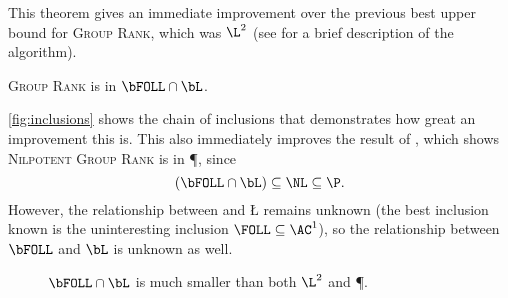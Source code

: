 \documentclass{article}
\begin{document}
This theorem gives an immediate improvement over the previous best upper bound for \textsc{Group Rank}, which was $\L^2$ \cite{lsz77} (see \cite[Proposition~3]{at06} for a brief description of the algorithm).

\begin{corollary}\label{cor:grouprank}
  \textsc{Group Rank} is in $\bFOLL \cap \bL$.
\end{corollary}

\autoref{fig:inclusions} shows the chain of inclusions that demonstrates how great an improvement this is.
This also immediately improves the result of \cite[Theorem~7]{at06}, which shows \textsc{Nilpotent Group Rank} is in \P, since
$$
(\bFOLL \cap \bL) \subseteq \NL \subseteq \P.
$$
However, the relationship between \FOLL{} and \L{} remains unknown (the best inclusion known is the uninteresting inclusion $\FOLL \subseteq \AC^1$), so the relationship between $\bFOLL$ and $\bL$ is unknown as well.

\begin{figure}
  \caption{\label{fig:inclusions}$\bFOLL \cap \bL$ is much smaller than both $\L^2$ and \P.}
  \begin{center}
  \end{center}
\end{figure}

\end{document}
